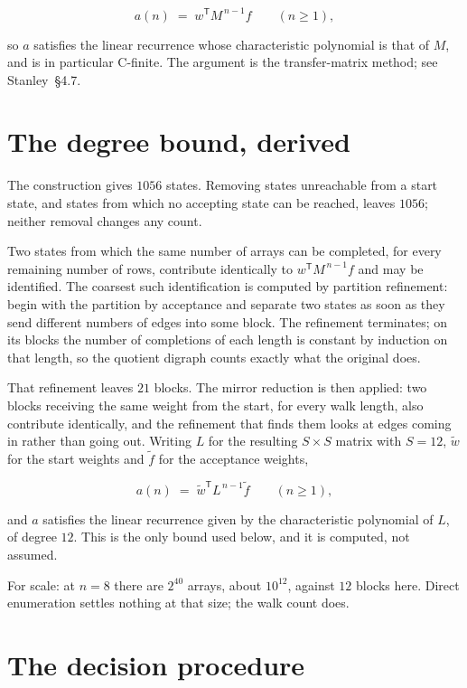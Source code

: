 \documentclass[11pt]{article}
\theoremstyle{definition}
\begin{document}
\[a(n) \;=\; w^{\mathsf T} M^{\,n-1} f \qquad (n \ge 1),\]

so $a$ satisfies the linear recurrence whose characteristic polynomial is that of $M$, and is in particular C-finite. The argument is the transfer-matrix method; see Stanley~\S4.7.

\section{The degree bound, derived}

The construction gives $1056$ states. Removing states unreachable from a start state, and states from which no accepting state can be reached, leaves $1056$; neither removal changes any count.

Two states from which the same number of arrays can be completed, for every remaining number of rows, contribute identically to $w^{\mathsf T}M^{\,n-1}f$ and may be identified. The coarsest such identification is computed by partition refinement: begin with the partition by acceptance and separate two states as soon as they send different numbers of edges into some block. The refinement terminates; on its blocks the number of completions of each length is constant by induction on that length, so the quotient digraph counts exactly what the original does.

That refinement leaves $21$ blocks. The mirror reduction is then applied: two blocks receiving the same weight from the start, for every walk length, also contribute identically, and the refinement that finds them looks at edges coming in rather than going out. Writing $L$ for the resulting $S \times S$ matrix with $S = 12$, $\tilde w$ for the start weights and $\tilde f$ for the acceptance weights,

\[a(n) \;=\; \tilde w^{\mathsf T} L^{\,n-1} \tilde f \qquad (n \ge 1),\]

and $a$ satisfies the linear recurrence given by the characteristic polynomial of $L$, of degree $12$. This is the only bound used below, and it is computed, not assumed.

For scale: at $n = 8$ there are $2^{40}$ arrays, about $10^{12}$, against $12$ blocks here. Direct enumeration settles nothing at that size; the walk count does.

\section{The decision procedure}
\end{document}
